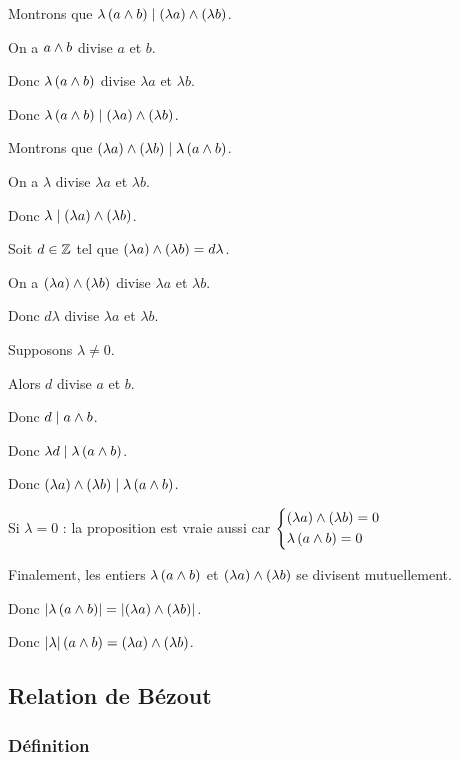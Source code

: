 \begin{dem}
Montrons que \(\lambda\left(a\land b\right)\mid\left(\lambda a\right)\land\left(\lambda b\right)\).

On a \(a\land b\) divise \(a\) et \(b\).

Donc \(\lambda\left(a\land b\right)\) divise \(\lambda a\) et \(\lambda b\).

Donc \(\lambda\left(a\land b\right)\mid\left(\lambda a\right)\land\left(\lambda b\right)\).

Montrons que \(\left(\lambda a\right)\land\left(\lambda b\right)\mid\lambda\left(a\land b\right)\).

On a \(\lambda\) divise \(\lambda a\) et \(\lambda b\).

Donc \(\lambda\mid\left(\lambda a\right)\land\left(\lambda b\right)\).

Soit \(d\in\mathbb{Z}\) tel que \(\left(\lambda a\right)\land\left(\lambda b\right)=d\lambda\).

On a \(\left(\lambda a\right)\land\left(\lambda b\right)\) divise \(\lambda a\) et \(\lambda b\).

Donc \(d\lambda\) divise \(\lambda a\) et \(\lambda b\).

Supposons \(\lambda\not=0\).

Alors \(d\) divise \(a\) et \(b\).

Donc \(d\mid a\land b\).

Donc \(\lambda d\mid\lambda\left(a\land b\right)\).

Donc \(\left(\lambda a\right)\land\left(\lambda b\right)\mid\lambda\left(a\land b\right)\).

Si \(\lambda=0\) : la proposition est vraie aussi car \(\begin{dcases}\left(\lambda a\right)\land\left(\lambda b\right)=0 \\ \lambda\left(a\land b\right)=0\end{dcases}\)

Finalement, les entiers \(\lambda\left(a\land b\right)\) et \(\left(\lambda a\right)\land\left(\lambda b\right)\) se divisent mutuellement.

Donc \(\left\lvert\lambda\left(a\land b\right)\right\rvert=\left\lvert\left(\lambda a\right)\land\left(\lambda b\right)\right\rvert\).

Donc \(\left\lvert\lambda\right\rvert\left(a\land b\right)=\left(\lambda a\right)\land\left(\lambda b\right)\).
\end{dem}

\subsection{Relation de Bézout}

\subsubsection{Définition}

